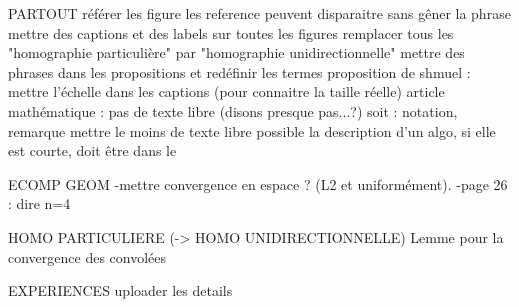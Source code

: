 PARTOUT
	référer les figure
	les reference peuvent disparaitre sans gêner la phrase
	mettre des captions et des labels sur toutes les figures
	remplacer tous les "homographie particulière" par "homographie unidirectionnelle"
	mettre des phrases dans les propositions et redéfinir les termes
	proposition de shmuel : mettre l'échelle dans les captions (pour connaitre la taille réelle)
	article mathématique : pas de texte libre (disons presque pas...?)
		soit : notation, remarque
	mettre le moins de texte libre possible
	la description d'un algo, si elle est courte, doit être dans le \caption


DECOMP GEOM 
	-mettre convergence en espace ? (L2 et uniformément).
	-page 26 : dire n=4


HOMO PARTICULIERE (-> HOMO UNIDIRECTIONNELLE)
	Lemme pour la convergence des convolées



EXPERIENCES
	uploader les details
